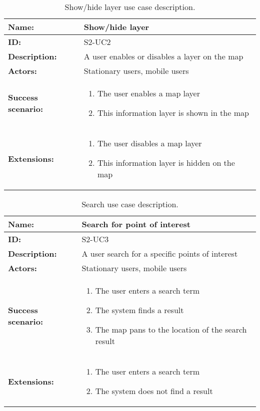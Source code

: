 \begin{table}[h!]
    \centering
    \begin{tabularx}{\textwidth}{|l|X|}
        \hline
        \textbf{Name:}  & Show/hide layer \\ \hline
        \textbf{ID:}    & S2-UC2 \\ \hline
        \textbf{Description:} & A user enables or disables a layer on the map \\ \hline
        \textbf{Actors:} & Stationary users, mobile users \\ \hline
        \textbf{Success scenario:} & 
        \begin{enumerate}
            \item The user enables a map layer
            \item This information layer is shown in the map
        \end{enumerate}
        \\ \hline
        \textbf{Extensions:} & 
        \begin{enumerate}
            \item The user disables a map layer
            \item This information layer is hidden on the map
        \end{enumerate}
        \\ \hline
    \end{tabularx}
    \caption{Show/hide layer use case description.}
    \label{tab:s2-uc2}
\end{table}

\begin{table}[h!]
    \centering
    \begin{tabularx}{\textwidth}{|l|X|}
        \hline
        \textbf{Name:}  & Search for point of interest \\ \hline
        \textbf{ID:}    & S2-UC3 \\ \hline
        \textbf{Description:} & A user search for a specific points of interest \\ \hline
        \textbf{Actors:} & Stationary users, mobile users \\ \hline
        \textbf{Success scenario:} & 
        \begin{enumerate}
            \item The user enters a search term
            \item The system finds a result
            \item The map pans to the location of the search result
        \end{enumerate}
        \\ \hline
        \textbf{Extensions:} & 
        \begin{enumerate}
            \item The user enters a search term
            \item The system does not find a result
        \end{enumerate}
        \\ \hline
    \end{tabularx}
    \caption{Search use case description.}
    \label{tab:s2-uc3}
\end{table}


